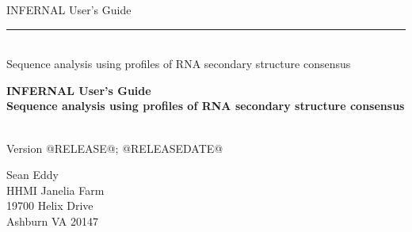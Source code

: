 \begin{titlepage}
{\Large

\vspace*{\fill}

\begin{latexonly}
\noindent
{\Huge \textsf{INFERNAL User's Guide}} \\ 
\rule[2pt]{\textwidth}{1pt} \\
\hspace*{\fill} {\large \textsf{Sequence analysis using profiles of RNA secondary structure consensus}\\}
\end{latexonly}

\begin{htmlonly}
\begin{center}
{\Huge \textbf{INFERNAL User's Guide}}\\
{\large \textbf{Sequence analysis using profiles of RNA secondary
structure consensus}}\\
\end{center}
\end{htmlonly}

\vspace*{\fill}

\begin{center}
\textsl{}\\
Version @RELEASE@; @RELEASEDATE@ \\ 

\vspace*{\fill}

Sean Eddy\\
HHMI Janelia Farm\\
19700 Helix Drive\\
Ashburn VA 20147\\
\textsl{} \\
\end{center}

\vspace*{\fill}

}
\end{titlepage}
